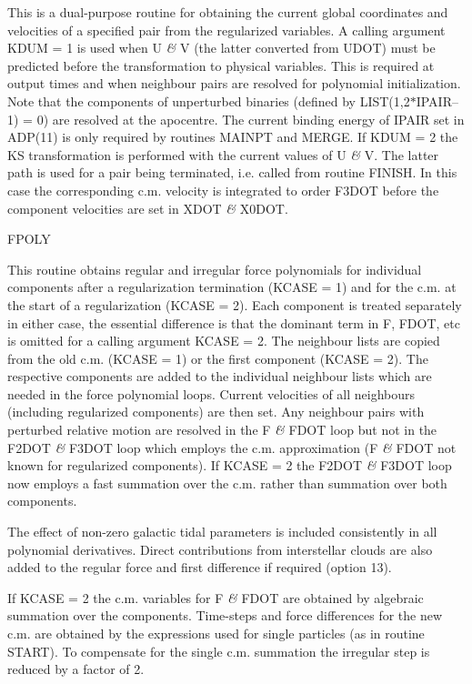  This is a dual-purpose routine for obtaining the current global coordinates
 and velocities of a specified pair from the regularized variables.  A calling
 argument KDUM = 1 is used when U {\it\&} V (the latter converted from UDOT) must be
 predicted before the transformation to physical variables.  This is required
 at output times and when neighbour pairs are resolved for polynomial
 initialization.  Note that the components of unperturbed binaries (defined by
 LIST(1,2$\ast$IPAIR--1) = 0) are resolved at the apocentre.  The current binding
 energy of IPAIR set in ADP(11) is only required by routines MAINPT and MERGE.  If 
 KDUM = 2 the KS transformation is performed with the
 current values of U {\it\&} V.  The latter path is used for a pair being terminated,
 i.e. called from routine FINISH.  In this case the corresponding c.m. velocity
 is integrated to order F3DOT before the component velocities are set in XDOT
 {\it\&} X0DOT.
\bigskip
\bigskip
\centerline {FPOLY}
\bigskip

 This routine obtains regular and irregular force polynomials for individual
 components after a regularization termination (KCASE = 1) and for the c.m. at
 the start of a regularization (KCASE = 2).  Each component is treated
 separately in either case, the essential difference is that the dominant term
 in F, FDOT, etc is omitted for a calling argument KCASE = 2.  The neighbour
 lists are copied
 from the old c.m. (KCASE = 1) or the first component (KCASE = 2).  The
 respective components are added to the individual neighbour lists which are
 needed in the force polynomial loops.  Current velocities of all neighbours
 (including regularized components) are then set.  Any neighbour pairs with
 perturbed relative motion are resolved in
 the F {\it\&} FDOT loop but not in the F2DOT {\it\&} F3DOT loop which employs the c.m.
 approximation (F {\it\&} FDOT not known for regularized components).  If
 KCASE = 2 the F2DOT {\it\&} F3DOT loop now employs a fast summation over the
 c.m. rather than summation over both components.

 The effect of non-zero galactic tidal parameters is included consistently in
 all polynomial derivatives.  Direct contributions from interstellar clouds are
 also added to the regular force and first difference if required (option 13).

 If KCASE = 2 the c.m. variables for F {\it\&} FDOT are obtained by algebraic 
 summation over the
 components.  Time-steps and force differences for the new c.m. are obtained
 by the expressions used for single particles (as in routine START).  To
 compensate for the single c.m. summation the irregular step is reduced
 by a factor of 2.

